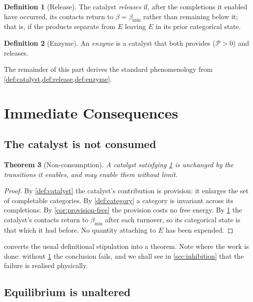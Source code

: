 \documentclass[11pt,twocolumn,a4paper]{article}
\theoremstyle{plain}
\newtheorem{theorem}{Theorem}[section]
\theoremstyle{definition}
\newtheorem{definition}[theorem]{Definition}
\theoremstyle{remark}
\newcommand{\thick}{\beta}
\newcommand{\floor}{\thick_{\min}}
\newcommand{\Enz}{E}
\newcommand{\prov}{\mathcal{P}}
\begin{document}
\begin{definition}[Release]
\label{def:release}
The catalyst \emph{releases} if, after the completions it enabled have occurred,
its contacts return to $\thick = \floor$ rather than remaining below it; that
is, if the products separate from $\Enz$ leaving $\Enz$ in its prior
categorical state.
\end{definition}

\begin{definition}[Enzyme]
\label{def:enzyme}
An \emph{enzyme} is a catalyst that both provides ($\prov > 0$) and releases.
\end{definition}

The remainder of this part derives the standard phenomenology from
\cref{def:catalyst,def:release,def:enzyme}.

\section{Immediate Consequences}
\label{sec:consequences}

\subsection{The catalyst is not consumed}

\begin{theorem}[Non-consumption]
\label{thm:not-consumed}
A catalyst satisfying \cref{def:release} is unchanged by the transitions it
enables, and may enable them without limit.
\end{theorem}

\begin{proof}
By \cref{def:catalyst} the catalyst's contribution is provision: it enlarges the
set of completable categories. By \cref{def:category} a category is invariant
across its completions. By \cref{cor:provision-free} the provision costs no free
energy. By \cref{def:release} the catalyst's contacts return to $\floor$ after
each turnover, so its categorical state is that which it had before. No
quantity attaching to $\Enz$ has been expended.
\end{proof}

 converts the usual definitional stipulation into a
theorem. Note where the work is done: without \cref{def:release} the conclusion
fails, and we shall see in \cref{sec:inhibition} that the failure is realised
physically.

\subsection{Equilibrium is unaltered}
\end{document}
